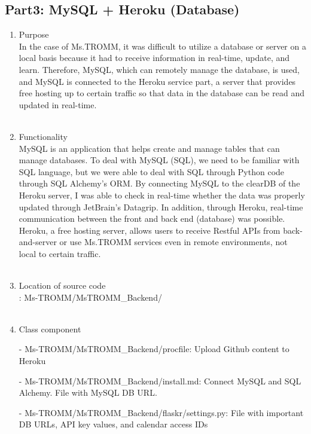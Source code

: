 \documentclass[conference]{IEEEtran}
\begin{document}
\subsection{Part3: MySQL + Heroku (Database)}
\begin{enumerate}
    \item Purpose \\
    In the case of Ms.TROMM, it was difficult to utilize a database or server on a local basis because it had to receive information in real-time, update, and learn. Therefore, MySQL, which can remotely manage the database, is used, and MySQL is connected to the Heroku service part, a server that provides free hosting up to certain traffic so that data in the database can be read and updated in real-time. \\ \\
    \item Functionality \\
    MySQL is an application that helps create and manage tables that can manage databases. To deal with MySQL (SQL), we need to be familiar with SQL language, but we were able to deal with SQL through Python code through SQL Alchemy's ORM. By connecting MySQL to the clearDB of the Heroku server, I was able to check in real-time whether the data was properly updated through JetBrain's Datagrip. In addition, through Heroku, real-time communication between the front and back end (database) was possible. Heroku, a free hosting server, allows users to receive Restful APIs from back-and-server or use Ms.TROMM services even in remote environments, not local to certain traffic.\\ \\
    \item Location of source code\\: Ms-TROMM/MsTROMM\_Backend/ \\ \\
    \item Class component \\
        \item[-] Ms-TROMM/MsTROMM\_Backend/procfile: Upload Github content to Heroku \\
        \item[-] Ms-TROMM/MsTROMM\_Backend/install.md: Connect MySQL and SQL Alchemy. File with MySQL DB URL. \\
        \item[-] Ms-TROMM/MsTROMM\_Backend/flaskr/settings.py: File with important DB URLs, API key values, and calendar access IDs \\ \\

\end{enumerate}
\end{document}
